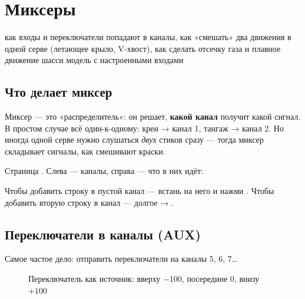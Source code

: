 \chapter{Миксеры}
\label{ch:mixes}
\chapterintro
  {как входы и переключатели попадают в каналы, как «смешать» два движения в одной серве
   (летающее крыло, V-хвост), как сделать отсечку газа и плавное движение шасси}
  {модель с настроенными входами}

\section{Что делает миксер}

\begin{simple}
Миксер --- это «распределитель»: он решает, \textbf{какой канал} получит какой сигнал.
В простом случае всё один-к-одному: крен → канал 1, тангаж → канал 2. Но иногда одной
серве нужно слушаться \emph{двух} стиков сразу --- тогда миксер складывает сигналы, как
смешивают краски.
\end{simple}

Страница . Слева --- каналы, справа --- что в них идёт:

\begin{center}
\end{center}

Чтобы добавить строку в пустой канал --- встань на него и нажми . Чтобы добавить
вторую строку в канал --- долгое  → .

\section{Переключатели в каналы (AUX)}

Самое частое дело: отправить переключатели на каналы 5, 6, 7…

\begin{figure}[H]
\centering
{}
\caption{Переключатель как источник: вверху $-100$, посередине 0, внизу $+100$}
\end{figure}

